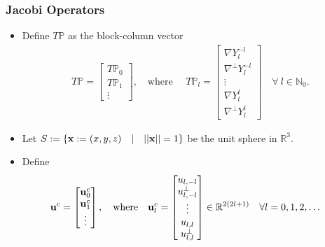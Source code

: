 \documentclass[10pt]{beamer}
\newcommand{\R}{\mathbb{R}}
\newcommand{\No}{\mathbb{N}_0}
\newcommand{\gradP}{T\mathbb{P}}
\newcommand{\gradY}{\nabla Y}
\newcommand{\gradpY}{\nabla^\perp Y}
\begin{document}
\frame
{
    \frametitle{Jacobi Operators}

\begin{itemize}

\item Define \(\gradP\) as the block-column vector
\begin{align}
\gradP = \begin{bmatrix} \gradP_0 \\ \gradP_1 \\ \vdots \end{bmatrix}, \quad \text{where } \quad \gradP_l = \begin{bmatrix} \gradY^{-l}_l \\ \gradpY^{-l}_l \\ \vdots \\ \gradY^{l}_l \\ \gradpY^{l}_l  \end{bmatrix} \quad \forall \: l \in \No.
\end{align}

\item Let $S := \{ \bold{x} := (x,y,z) \quad | \quad ||\bold{x}|| = 1\}$ be the unit sphere in $\R^3$.

\item Define
\begin{align}
\bold{u}^c = \begin{bmatrix}
			\bold{u}_0^c \\
			\bold{u}_1^c \\
			\vdots \\
		    \end{bmatrix},		  
\quad
\text{where}
\quad
\bold{u}^c_l &= \begin{bmatrix}
				u_{l,-l} \\
				u^{\perp}_{l,-l} \\
				\vdots \\
				u_{l,l} \\
				u^{\perp}_{l,l}
		        \end{bmatrix} \in \R^{2(2l+1)} \quad \forall l = 0,1,2,\dots
\end{align}

\end{itemize}

}
\end{document}
